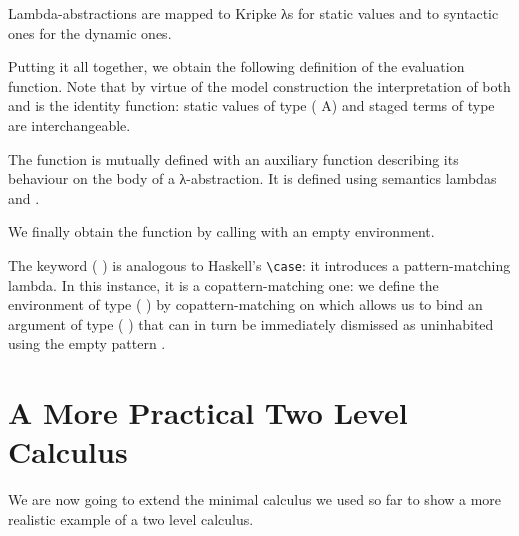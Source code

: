 
Lambda-abstractions are mapped to Kripke λs for static values
and to syntactic ones for the dynamic ones.


Putting it all together, we obtain the following definition
of the evaluation function.
Note that by virtue of the model construction the interpretation
of both  and  is the identity function:
static values of type ( A) and staged terms of type 
are interchangeable.

\begin{AgdaSuppressSpace}
\end{AgdaSuppressSpace}

The function  is mutually defined with an auxiliary
function describing its behaviour on the body of a λ-abstraction.
It is defined using semantics lambdas and .

\begin{AgdaSuppressSpace}
\end{AgdaSuppressSpace}

We finally obtain the  function by calling  with an
empty environment.

\begin{AgdaSuppressSpace}
\end{AgdaSuppressSpace}

\begin{remark}
The keyword ( ) is analogous to Haskell's
\texttt{\textbackslash{}case}: it introduces a pattern-matching lambda.
In this instance, it is a copattern-matching one: we define
the environment of type (  ) by
copattern-matching on {} which allows us to bind
an argument of type (  ) that can in turn
be immediately dismissed as uninhabited using the empty pattern \AS{()}.
\end{remark}

\section{A More Practical Two Level Calculus}

We are now going to extend the minimal calculus we used so far to
show a more realistic example of a two level calculus.

